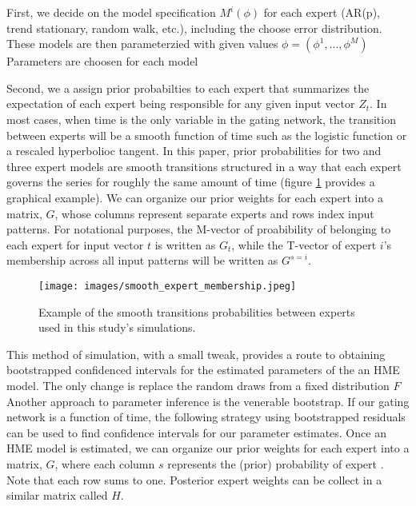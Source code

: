 \documentclass[12pt]{article}
\begin{document}
First, we decide on the model specification $M^{i}(\phi)$ for each expert (AR(p), trend stationary, random walk, etc.), including the choose error distribution. These models are then parameterzied with given values $\phi=(\phi^{1},\dots,\phi^{M})$ Parameters are choosen for each model

Second, we a assign prior probabilties to each expert that summarizes the expectation of each expert being responsible for any given input vector $Z_{t}$. In most cases, when time is the only variable in the gating network, the transition between experts will be a smooth function of time such as the logistic function or a rescaled hyperbolioc tangent. In this paper, prior probabilities for two and three expert models are smooth transitions structured in a way that each expert governs the series for roughly the same amount of time (figure \ref{fig:expertmembership} provides a graphical example). We can organize our prior weights for each expert into a matrix, $G$, whose columns represent separate experts and rows index input patterns. For notational purposes, the M-vector of proabibility of belonging to each expert for input vector $t$ is written as $G_{t}$, while the T-vector of expert $i$'s membership across all input patterns will be written as $G^{s=i}$.

\begin{figure}[ht]
  \centering
  \texttt{[image: images/smooth\_expert\_membership.jpeg]}
  \caption{Example of the smooth transitions probabilities between experts used in this study's simulations.}
  \label{fig:expertmembership}
\end{figure}

This method of simulation, with a small tweak, provides a route to obtaining bootstrapped confidenced intervals for the estimated parameters of the an HME model. The only change is replace the random draws from a fixed distribution $F$ Another approach to parameter inference is the venerable bootstrap. If our gating network is a function of time, the following strategy using bootstrapped residuals can be used to find confidence intervals for our parameter estimates. Once an HME model is estimated, we can organize our prior weights for each expert into a matrix, $G$, where each column $s$ represents the (prior) probability of expert . Note that each row sums to one. Posterior expert weights can be collect in a similar matrix called $H$.

\end{document}
